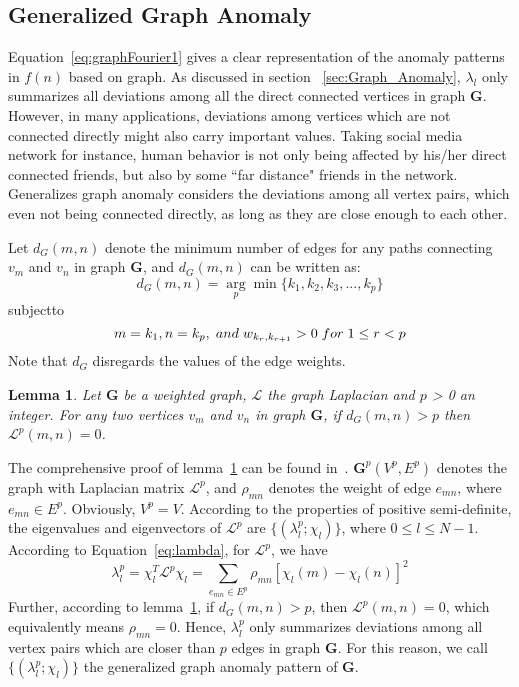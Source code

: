 \subsection{Generalized Graph Anomaly}
\label{sec:Generalized_Graph_Anomaly}
Equation~\ref{eq:graphFourier1} gives a clear representation of the anomaly patterns in $f(n)$ based on graph.  As discussed in section ~\ref{sec:Graph_Anomaly}, $\lambda_l$ only summarizes all deviations among all the direct connected vertices in graph $\mathbf{G}$.
However, in many applications,
deviations among vertices which are not connected directly might also carry important values. Taking social media network for instance, human behavior is not only being affected by his/her direct connected friends, but also by some ``far distance" friends in the network. Generalizes graph anomaly considers the deviations among all vertex pairs, which even not being connected directly, as long as they are close enough to each other.


Let $d_G(m,n)$ denote the minimum number of edges for any paths connecting $v_m$
and $v_n$ in graph $\mathbf{G}$, and $d_G(m,n)$ can be written as:
\begin{equation}
d_G(m,n)=\underset{p}\arg\min\{k_1,k_2,k_3,...,k_p\}
\end{equation}
subject\hspace{1mm}to
\begin{equation}
m=k_1, n=k_p, \hspace{1mm}and\hspace{1mm} w_{k_r,k_{r+1}}>0 \hspace{1mm} for \hspace{1mm} 1\leq r<p
\end{equation}
Note that $d_G$ disregards the values of the edge weights.
\newtheorem{thm}{Theorem}
\newtheorem{lem}[thm]{Lemma}
\begin{lem}
\label{lem:1}
Let $\mathbf{G}$ be a weighted graph, $\mathcal{L}$ the graph Laplacian and $p$ > 0 an integer. For any two
vertices $v_m$ and $v_n$ in graph $\mathbf{G}$, if $d_G(m,n) > p $ then $\mathcal{L}^p
(m,n) = 0$.
\end{lem}
The comprehensive proof of lemma~\ref{lem:1} can be found in~\cite{hammond2011wavelets}. $\mathbf{G}^p(V^p,E^p)$ denotes the graph with Laplacian matrix $\mathcal{L}^p$, and $\rho_{mn}$ denotes the weight of edge $e_{mn}$, where $e_{mn}\in E^p$. Obviously, $V^p=V$. According to the properties of  positive semi-definite, the eigenvalues and eigenvectors of $\mathcal{L}^p$ are $\{(\lambda_l^p;\chi_l)\}$, where $0\leq l \leq {N-1}$. According to Equation~\ref{eq:lambda}, for $\mathcal{L}^p$, we have
\begin{equation}
\label{eq:lambda2}
\lambda_{l}^p=\chi_{l}^T\mathcal{L}^p\chi_{l}= \sum_{e_{mn}\in E^p} \rho_
{mn}[\chi_{l}(m)-\chi_{l}(n)]^2
\end{equation}
Further, according to lemma~\ref{lem:1}, if $d_G(m,n)>p$, then $\mathcal{L}^p(m,n)=0$, which equivalently means $\rho_{mn}=0$. Hence, $\lambda_l^p$ only summarizes deviations among all vertex pairs which are closer than $p$ edges in graph $\mathbf{G}$. For this reason, we call $\{(\lambda_l^p;\chi_l)\}$ the generalized graph anomaly pattern of $\mathbf{G}$.

